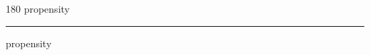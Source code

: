
\begin{frame}
\begin{center}
\begin{turn}{180}
{\fontsize{2.5cm}{1em}\selectfont propensity}
\end{turn}
\vspace{1em}\par  
\hrule
\vspace{1em}\par  
{\fontsize{2.5cm}{1em}\selectfont propensity}
\end{center}
\end{frame}
